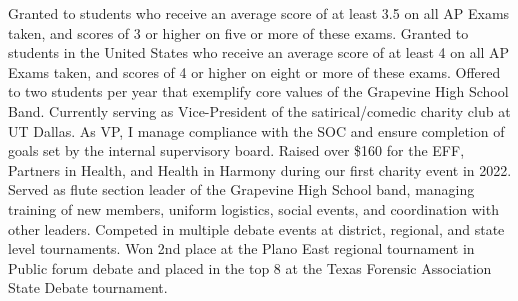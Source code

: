 \documentclass[
    10pt,
    A4,
    english,
    draft = false,
    twoside = false,
]{article}
\begin{document}
        {Granted to students who receive an average score of at least 3.5 on
        all AP Exams taken, and scores of 3 or higher on five or more of these
        exams.}
        {Granted to students in the United States who receive an average score
        of at least 4 on all AP Exams taken, and scores of 4 or higher on eight
        or more of these exams.}
        {Offered to two students per year that exemplify core values of the
        Grapevine High School Band.}
        {Currently serving as Vice-President of the satirical/comedic charity
        club at UT Dallas. As VP, I manage compliance with the SOC and ensure
        completion of goals set by the internal supervisory board. Raised over
        \$160 for the EFF, Partners in Health, and Health in Harmony during our
        first charity event in 2022.}
        {Served as flute section leader of the Grapevine High School band,
        managing training of new members, uniform logistics, social events, and
        coordination with other leaders.}
        {Competed in multiple debate events at district, regional, and state
        level tournaments. Won 2nd place at the Plano East regional tournament
        in Public forum debate and placed in the top 8 at the Texas Forensic
        Association State Debate tournament.}
\end{document}

